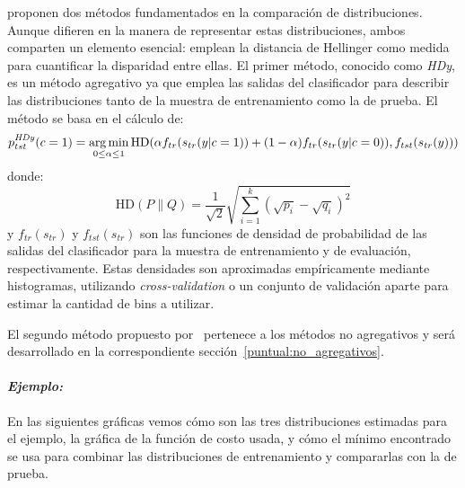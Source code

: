 \citet{gonzalez2013class} proponen dos métodos fundamentados en la comparación
de distribuciones. Aunque difieren en la manera de representar estas
distribuciones, ambos comparten un elemento esencial: emplean la distancia de
Hellinger como medida para cuantificar la disparidad entre ellas. El primer
método, conocido como {\it HDy}, es un método agregativo ya que emplea las
salidas del clasificador para describir las distribuciones tanto de la muestra
de entrenamiento como la de prueba. El método se basa en el cálculo de:
\begin{equation}\label{ecuacion:hdy}
    p^{\it HDy \/}_{tst}(c=1) = \operatorname*{arg\,min}_{0 \leq \alpha \leq 1}{\text{HD}}(\alpha f_{tr}{(s_{tr}(y|c=1))}+(1-\alpha) f_{tr}{(s_{tr}(y|c=0))}, f_{tst}{(s_{tr}(y))})
\end{equation}
donde:
\begin{equation}\label{ecuacion:hd}
    {\text{HD}}(P \parallel Q)= \frac{1}{\sqrt{2}}{\sqrt {\sum _{i=1}^{k}{({\sqrt {p_{i}}}-{\sqrt {q_{i}}})}^{2}}}
\end{equation}
y $f_{tr}(s_{tr})$ y $f_{tst}(s_{tr})$ son las funciones de densidad de
probabilidad de las salidas del clasificador para la muestra de entrenamiento y
de evaluación, respectivamente. Estas densidades son aproximadas empíricamente
mediante histogramas, utilizando {\it cross-validation\/} o un conjunto de
validación aparte para estimar la cantidad de bins a utilizar.

El segundo método propuesto por~\citet{gonzalez2013class} pertenece a los
métodos no agregativos y será desarrollado en la correspondiente
sección~\ref{puntual:no_agregativos}.

\paragraph{\it Ejemplo:\/} En las siguientes gráficas vemos cómo son las tres
distribuciones estimadas para el ejemplo, la gráfica de la función de costo
usada, y cómo el mínimo encontrado se usa para combinar las distribuciones de
entrenamiento y compararlas con la de prueba.

